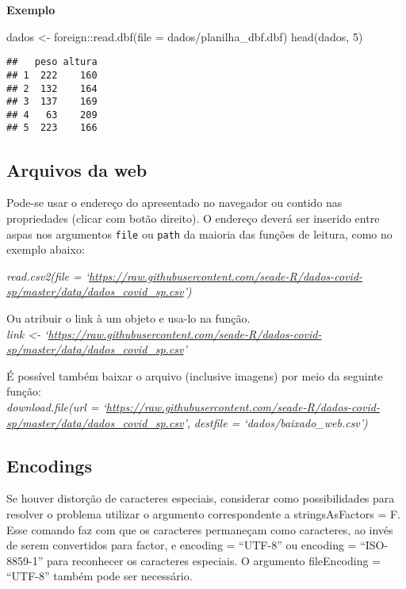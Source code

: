 \documentclass[
]{book}
\newenvironment{Shaded}{\begin{snugshade}}{\end{snugshade}}
\newcommand{\AttributeTok}[1]{\textcolor[rgb]{0.77,0.63,0.00}{#1}}
\newcommand{\DecValTok}[1]{\textcolor[rgb]{0.00,0.00,0.81}{#1}}
\newcommand{\FunctionTok}[1]{\textcolor[rgb]{0.00,0.00,0.00}{#1}}
\newcommand{\NormalTok}[1]{#1}
\newcommand{\OtherTok}[1]{\textcolor[rgb]{0.56,0.35,0.01}{#1}}
\newcommand{\SpecialCharTok}[1]{\textcolor[rgb]{0.00,0.00,0.00}{#1}}
\newcommand{\StringTok}[1]{\textcolor[rgb]{0.31,0.60,0.02}{#1}}
\theoremstyle{definition}
\theoremstyle{definition}
\theoremstyle{definition}
\theoremstyle{definition}
\theoremstyle{remark}
\begin{document}
\textbf{Exemplo}

\begin{Shaded}
\begin{Highlighting}[]
\NormalTok{dados }\OtherTok{\textless{}{-}}\NormalTok{ foreign}\SpecialCharTok{::}\FunctionTok{read.dbf}\NormalTok{(}\AttributeTok{file =} \StringTok{\textquotesingle{}dados/planilha\_dbf.dbf\textquotesingle{}}\NormalTok{)}
\FunctionTok{head}\NormalTok{(dados, }\DecValTok{5}\NormalTok{)}
\end{Highlighting}
\end{Shaded}

\begin{verbatim}
##   peso altura
## 1  222    160
## 2  132    164
## 3  137    169
## 4   63    209
## 5  223    166
\end{verbatim}

\hypertarget{arquivos-da-web}{%
\subsection{Arquivos da web}\label{arquivos-da-web}}

Pode-se usar o endereço do apresentado no navegador ou contido nas propriedades (clicar com botão direito). O endereço deverá ser inserido entre aspas nos argumentos \texttt{file} ou \texttt{path} da maioria das funções de leitura, como no exemplo abaixo:

\emph{read.csv2(file = `\url{https://raw.githubusercontent.com/seade-R/dados-covid-sp/master/data/dados_covid_sp.csv}')}

Ou atribuir o link à um objeto e usa-lo na função.\\
\emph{link \textless- `\url{https://raw.githubusercontent.com/seade-R/dados-covid-sp/master/data/dados_covid_sp.csv}'}

É possível também baixar o arquivo (inclusive imagens) por meio da seguinte função:\\
\emph{download.file(url = `\url{https://raw.githubusercontent.com/seade-R/dados-covid-sp/master/data/dados_covid_sp.csv}',}
\emph{destfile = `dados/baixado\_web.csv')}

\hypertarget{encodings}{%
\subsection{Encodings}\label{encodings}}

Se houver distorção de caracteres especiais, considerar como possibilidades para resolver o problema utilizar o argumento correspondente a stringsAsFactors = F. Esse comando faz com que os caracteres permaneçam como caracteres, ao invés de serem convertidos para factor, e encoding = ``UTF-8'' ou encoding = ``ISO-8859-1'' para reconhecer os caracteres especiais. O argumento fileEncoding = ``UTF-8'' também pode ser necessário.
\end{document}

